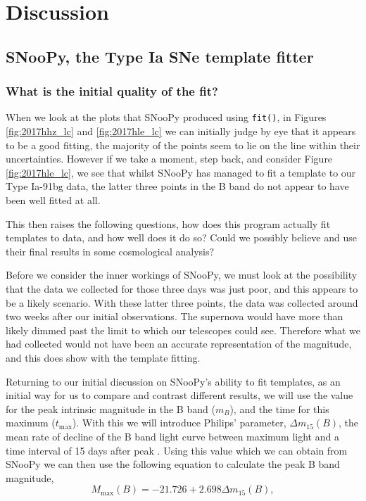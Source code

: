 \documentclass[twocolumn]{revtex4}
\begin{document}
\vspace{-3ex}
\section{Discussion}
\label{discussion}
\vspace{-2ex}

\subsection{SNooPy, the Type Ia SNe template fitter}
\vspace{-2ex}
\subsubsection{What is the initial quality of the fit?}
\vspace{-2ex}
When we look at the plots that SNooPy produced using \texttt{fit()}, in Figures \ref{fig:2017hhz_lc} and \ref{fig:2017hle_lc} we can initially judge by eye that it appears to be a good fitting, the majority of the points seem to lie on the line within their uncertainties. However if we take a moment, step back, and consider Figure \ref{fig:2017hle_lc}, we see that whilst SNooPy has managed to fit a template to our Type Ia-91bg data, the latter three points in the B band do not appear to have been well fitted at all.

This then raises the following questions, how does this program actually fit templates to data, and how well does it do so? Could we possibly believe and use their final results in some cosmological analysis?

Before we consider the inner workings of SNooPy, we must look at the possibility that the data we collected for those three days was just poor, and this appears to be a likely scenario. With these latter three points, the data was collected around two weeks after our initial observations. The supernova would have more than likely dimmed past the limit to which our telescopes could see. Therefore what we had collected would not have been an accurate representation of the magnitude, and this does show with the template fitting.

Returning to our initial discussion on SNooPy's ability to fit templates, as an initial way for us to compare and contrast different results, we will use the value for the peak intrinsic magnitude in the B band ($m_B$), and the time for this maximum ($t_{\max}$). With this we will introduce Philips' parameter, $\Delta m_{15}(B)$, the mean rate of decline of the B band light curve between maximum light and a time interval of 15 days after peak \cite{abs_phil}. Using this value which we can obtain from SNooPy we can then use the following equation to calculate the peak B band magnitude,
\begin{equation}
M_{\max}(B) = -21.726 + 2.698 \Delta m_{15}(B),
\label{intrinsic_b}
\end{equation}
\end{document}
